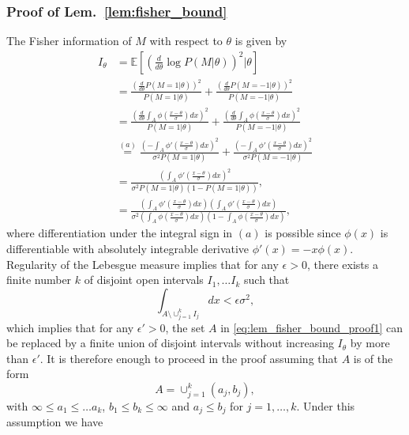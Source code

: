 \documentclass[letterpaper, conference]{IEEEtran}      %
\begin{document}
\subsubsection*{Proof of Lem.~\ref{lem:fisher_bound}}
The Fisher information of $M$ with respect to $\theta$ is given by
\begin{align}
I_\theta & =  \mathbb E \left[ \left( \frac{d}{d\theta} \log P\left( M | \theta \right) \right)^2 |\theta \right] \nonumber \\
& = \frac{ \left(\frac{d}{d\theta} P(M=1|\theta) \right)^2}{P(M=1| \theta)} + \frac{ \left(\frac{d}{d\theta} P(M=-1|\theta) \right)^2} {P(M=-1| \theta)} \nonumber \\
& =  \frac{ \left( \frac{d}{d\theta} \int_A \phi \left( \frac{x-\theta}{\sigma} \right)dx \right)^2} { P(M=1| \theta) } + \frac{ \left( \frac{d}{d\theta}\int_A \phi \left( \frac{x-\theta}{\sigma} \right)dx \right)^2} { P(M=-1| \theta) } \nonumber \\ 
& \overset{(a)}{=} \frac{ \left( - \int_A \phi' \left( \frac{x-\theta}{\sigma} \right)dx \right)^2} {\sigma^2 P(M=1| \theta) } + \frac{ \left(- \int_A \phi' \left( \frac{x-\theta}{\sigma} \right)dx \right)^2} { \sigma^2P(M=-1| \theta) } \nonumber \\ 
& = \frac{\left( \int_A \phi'\left( \frac{x-\theta}{\sigma} \right) dx \right)^2 }{  \sigma^2 P(M=1 | \theta) \left(1-P(M=1|\theta) \right)  }, \nonumber \\
& = \frac{\left( \int_A \phi'\left( \frac{x-\theta}{\sigma} \right) dx \right) \left( \int_A \phi'\left( \frac{x-\theta}{\sigma} \right) dx \right)}{  \sigma^2 \left( \int_A \phi \left( \frac{x-\theta}{\sigma} \right) dx \right)  \left(1- \int_A \phi \left( \frac{x-\theta}{\sigma} \right) dx \right) }, \label{eq:lem_fisher_bound_proof1}
\end{align}
where differentiation under the integral sign in $(a)$ is possible since $\phi(x)$ is differentiable with absolutely integrable derivative $\phi'(x) = -x\phi(x)$. Regularity of the Lebesgue measure implies that for any $\epsilon>0$, there exists a finite number $k$ of disjoint open intervals $I_1,\ldots I_k$ such that 
\[
\int_{A\setminus \cup_{j=1}^k I_j }  dx < \epsilon \sigma^2,
\]
which implies that for any $\epsilon' > 0$, the set $A$ in \eqref{eq:lem_fisher_bound_proof1} can be replaced by a finite union of disjoint intervals without increasing $I_\theta$ by more than $\epsilon'$. It is therefore enough to proceed in the proof assuming that $A$ is of the form
\[
A = \cup_{j=1}^k (a_j,b_j),
\]
with $\infty \leq a_1 \leq \ldots a_k$, $b_1 \leq b_k \leq \infty$ and $a_j \leq b_j$ for $j=1,\ldots,k$. Under this assumption we have
\end{document}
